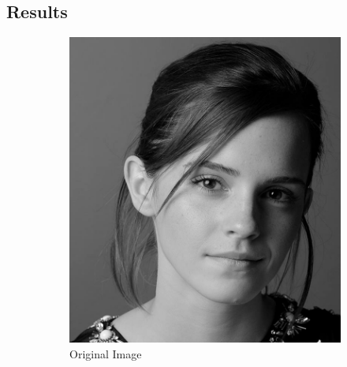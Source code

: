 \documentclass[12pt]{article}
\begin{document}
\subsection{Results}
\begin{figure}[H]
    \centering
    \begin{subfigure}{0.45\textwidth}
        \includegraphics[width=\textwidth]{resources/emma_original.jpg}
        \caption{Original Image}
    \end{subfigure}
    \hfill
    \begin{subfigure}{0.45\textwidth}

\end{subfigure}
\end{figure}
\end{document}
